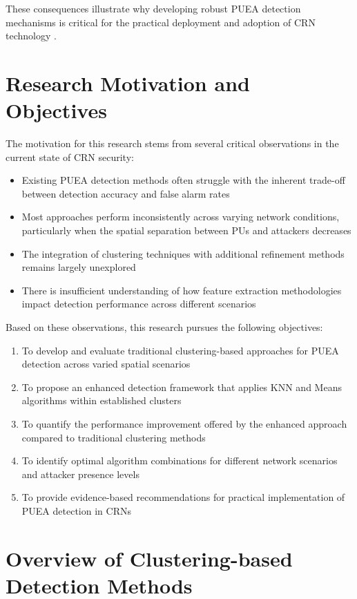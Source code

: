These consequences illustrate why developing robust PUEA detection mechanisms is critical for the practical deployment and adoption of CRN technology \cite{jin2010advanced}.

\section{Research Motivation and Objectives}

The motivation for this research stems from several critical observations in the current state of CRN security:

\begin{itemize}
    \item Existing PUEA detection methods often struggle with the inherent trade-off between detection accuracy and false alarm rates
    \item Most approaches perform inconsistently across varying network conditions, particularly when the spatial separation between PUs and attackers decreases
    \item The integration of clustering techniques with additional refinement methods remains largely unexplored
    \item There is insufficient understanding of how feature extraction methodologies impact detection performance across different scenarios
\end{itemize}

Based on these observations, this research pursues the following objectives:

\begin{enumerate}
    \item To develop and evaluate traditional clustering-based approaches for PUEA detection across varied spatial scenarios
    \item To propose an enhanced detection framework that applies KNN and Means algorithms within established clusters
    \item To quantify the performance improvement offered by the enhanced approach compared to traditional clustering methods
    \item To identify optimal algorithm combinations for different network scenarios and attacker presence levels
    \item To provide evidence-based recommendations for practical implementation of PUEA detection in CRNs
\end{enumerate}

\section{Overview of Clustering-based Detection Methods}


